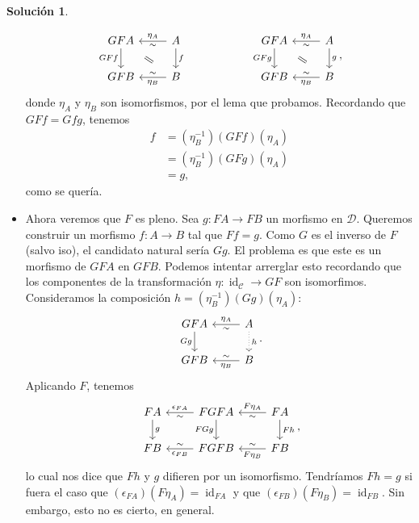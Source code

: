 \documentclass[12pt,letterpaper,titlepage]{article}
\theoremstyle{definition}
\newtheorem*{sol}{Solución}
\renewcommand\cal[1]{\mathcal{#1}}
\newcommand\com[2]{\ar[equal,from={#1},to={#2},shorten=5mm]}
\newcommand\<{\langle}
\renewcommand\>{\rangle}
\DeclareMathOperator{\id}{id}
\begin{document}
\begin{sol}
\begin{itemize}
\[\begin{tikzcd}
            GFA \ar[d,"GFf"'] & A \ar[l,"\eta_A"',"\sim"] \ar[d,"f"] \\
            GFB & B \ar[l,"\eta_B","\sim"']
            \com{1-1}{2-2}
        \end{tikzcd}
        \hspace{20mm}
        \begin{tikzcd}
            GFA \ar[d,"GFg"'] & A \ar[l,"\eta_A"',"\sim"] \ar[d,"g"] \\
            GFB & B \ar[l,"\eta_B","\sim"']
            \com{1-1}{2-2}
        \end{tikzcd}
        ,\]
        donde $\eta_A$ y $\eta_B$ son isomorfismos, por el lema que probamos.
        Recordando que $GFf=Gfg$, tenemos
        \begin{align*}
            f
            &= (\eta_B^{-1})(GFf)(\eta_A) \\
            &= (\eta_B^{-1})(GFg)(\eta_A) \\
            &= g,
        \end{align*}
        como se quería.
        
        \item
        Ahora veremos que $F$ es pleno.
        Sea $g:FA\to FB$ un morfismo en $\cal D$.
        Queremos construir un morfismo $f:A\to B$ tal que $Ff=g$.
        Como $G$ es el inverso de $F$ (salvo iso),
        el candidato natural sería $Gg$.
        El problema es que este es un
        morfismo de $GFA$ en $GFB$.
        Podemos intentar arrerglar esto recordando que los componentes de
        la transformación $\eta:\id_{\cal C} \to GF$ son isomorfimos.
        Consideramos la composición $h=(\eta_B^{-1})(Gg)(\eta_A)$:
        \[
        \begin{tikzcd}
            GFA \ar[d,"Gg"'] & A \ar[l,"\eta_A"',"\sim"] 
            \ar[d,"h",dotted]\\
            GFB & B \ar[l,"\eta_B","\sim"']
        \end{tikzcd}
        .\]
        Aplicando $F$, tenemos
        \[
        \begin{tikzcd}
            FA \ar[d,"g"]
                & \ar[l,"\epsilon_{FA}"',"\sim"] FGFA \ar[d,"FGg"']
                & FA \ar[l,"F\eta_A"',"\sim"]  \ar[d,"Fh"]\\
            FB  & FGFB \ar[l,"\epsilon_{FB}","\sim"']
                & FB \ar[l,"F\eta_B","\sim"']
        \end{tikzcd}
        ,\]
        lo cual nos dice que $Fh$ y $g$ difieren por un isomorfismo.
        Tendríamos $Fh=g$ si fuera el caso que
        $(\epsilon_{FA})(F\eta_A)=\id_{FA}$
        y que $(\epsilon_{FB})(F\eta_B)=\id_{FB}$.
        Sin embargo, esto no es cierto, en general.
        

\end{itemize}
\end{sol}
\end{document}
